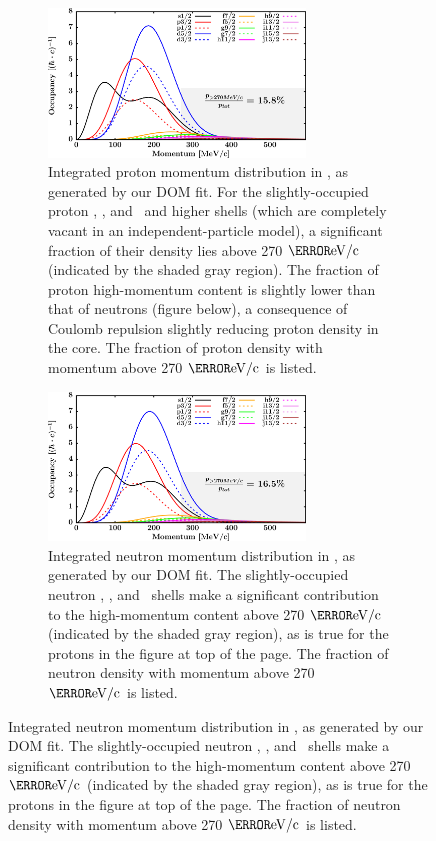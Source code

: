 \begin{figure}[tb]
    \centering
    \begin{subfigure}[c]{\textwidth}
        \centering
        \includegraphics[width=0.75\textwidth]{figures/ca40_protonLJMomentumDistIntegral.png}
        \caption[Proton momentum distribution in \caForty]
        {
            Integrated proton momentum distribution in \caForty, as generated
            by our DOM fit. For the slightly-occupied proton \fSeven, \fFive, and
            \gNine\ and higher shells (which are completely vacant in an
            independent-particle model), a significant fraction of their
            density lies above 270 $\mega\electronvolt/\text{c}$ (indicated by
            the shaded gray region). The fraction of
            proton high-momentum content is slightly lower than that of neutrons
            (figure below), a consequence of Coulomb repulsion slightly reducing
            proton density in the core. The fraction of proton density with
            momentum above 270 $\mega\electronvolt/\text{c}$ is listed.
        }
        \label{Ca40ProtonMomentumDistInt}
    \end{subfigure}\vspace{16pt}
    \begin{subfigure}[c]{\textwidth}
        \centering
        \includegraphics[width=0.75\textwidth]{figures/ca40_neutronLJMomentumDistIntegral.png}
        \caption[Neutron momentum distributions in \caForty]
        {
            Integrated neutron momentum distribution in \caForty, as generated
            by our DOM fit. The slightly-occupied neutron \fSeven, \fFive, and
            \gNine\ shells make a significant contribution to the high-momentum
            content above 270 $\mega\electronvolt/\text{c}$ (indicated by the
            shaded gray region), as is true for the protons in the figure at top
            of the page. The fraction of neutron density with
            momentum above 270 $\mega\electronvolt/\text{c}$ is listed.
        }
        \label{Ca40NeutronMomentumDistInt}
    \end{subfigure}
\end{figure}

